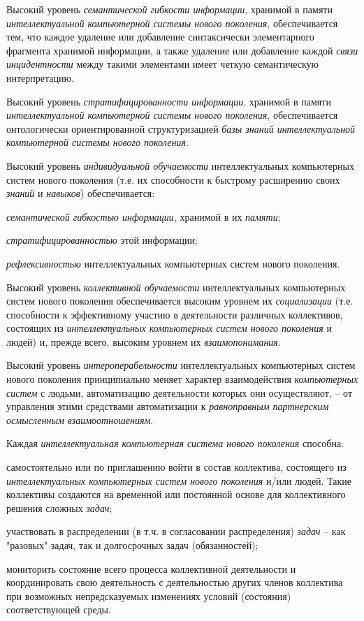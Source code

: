Высокий уровень \textit{семантической гибкости информации}, хранимой в памяти \textit{интеллектуальной компьютерной системы нового поколения}, обеспечивается тем, что каждое удаление или добавление синтаксически элементарного фрагмента хранимой информации, а также удаление или добавление каждой \textit{связи инцидентности} между такими элементами имеет четкую семантическую интерпретацию.

Высокий уровень \textit{стратифицированности информации}, хранимой в памяти \textit{интеллектуальной компьютерной системы нового поколения}, обеспечивается онтологически ориентированной структуризацией \textit{базы знаний интеллектуальной компьютерной системы нового поколения}.

Высокий уровень \textit{индивидуальной обучаемости} интеллектуальных компьютерных систем нового поколения (т.е. их способности к быстрому расширению своих \textit{знаний} и \textit{навыков}) обеспечивается:

\begin{textitemize}
	\item
	\textit{семантической гибкостью информации}, хранимой в их \textit{памяти};
	\item
	\textit{стратифицированностью} этой информации;
	\item
	\textit{рефлексивностью} интеллектуальных компьютерных систем нового поколения.
\end{textitemize}

Высокий уровень \textit{коллективной обучаемости} интеллектуальных компьютерных систем нового поколения обеспечивается высоким уровнем их \textit{социализации} (т.е. способности к эффективному участию в деятельности различных коллективов, состоящих из \textit{интеллектуальных компьютерных систем нового поколения} и людей) и, прежде всего, высоким уровнем их \textit{взаимопонимания}.

Высокий уровень \textit{интероперабельности} интеллектуальных компьютерных систем нового поколения принципиально меняет характер взаимодействия \textit{компьютерных систем} с людьми, автоматизацию деятельности которых они осуществляют, -- от управления этими средствами автоматизации к \textit{равноправным партнерским осмысленным взаимоотношениям}.

Каждая \textit{интеллектуальная компьютерная система нового поколения} способна:

\begin{textitemize}
	\item
	самостоятельно или по приглашению войти в состав коллектива, состоящего из \textit{интеллектуальных компьютерных систем нового поколения} и/или людей. Такие коллективы создаются на временной или постоянной основе для коллективного решения сложных \textit{задач};
	\item
	участвовать в распределении (в т.ч. в согласовании распределения) \textit{задач} -- как "разовых"{} задач, так и долгосрочных задач (обязанностей);
	\item
	мониторить состояние всего процесса коллективной деятельности и координировать свою деятельность с деятельностью других членов коллектива при возможных непредсказуемых изменениях условий (состояния) соответствующей среды.
\end{textitemize}

